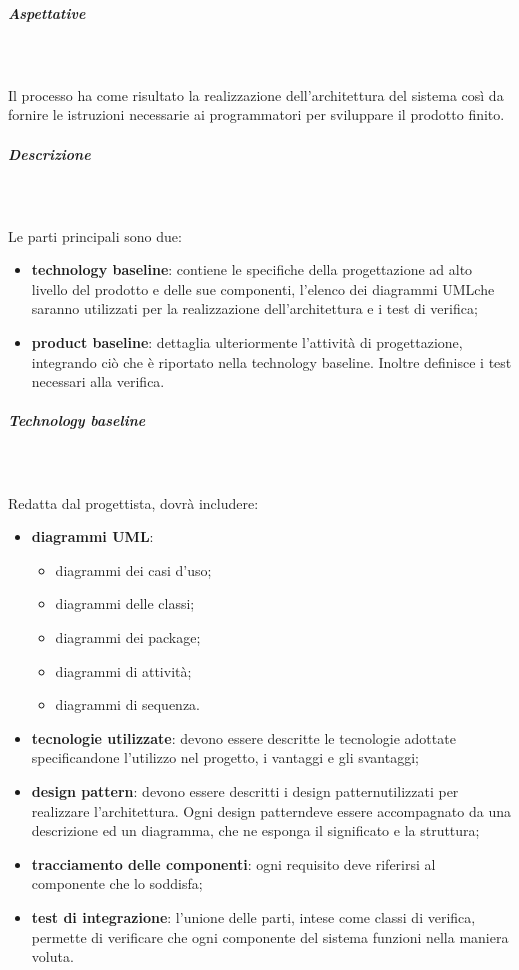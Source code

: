			
			\subparagraph{Aspettative} \mbox{}\\ \mbox{}\\
			\noindent Il processo ha come risultato la realizzazione dell'architettura del sistema così 
			da fornire le istruzioni necessarie ai programmatori per sviluppare il prodotto finito.
			\newline
			
			\subparagraph{Descrizione}  \mbox{}\\ \mbox{}\\
			\noindent Le parti principali sono due:
				\begin{itemize}
					\item \textbf{technology baseline}: contiene le specifiche della 
						progettazione ad alto livello del prodotto e delle sue componenti, l'elenco dei 
						diagrammi UML\glosp che saranno utilizzati per la realizzazione 
						dell'architettura e i test di verifica;
					\item \textbf{product baseline}: dettaglia ulteriormente l'attività di 
						progettazione, integrando ciò che è riportato nella technology baseline. Inoltre 
						definisce i test necessari alla verifica. \newline
				\end{itemize}
			
			
		\subparagraph{Technology baseline} \mbox{}\\ \mbox{}\\
				
			\noindent Redatta dal progettista, dovrà includere:
				\begin{itemize}
					\item \textbf{diagrammi UML\glo}:
					\begin{itemize}
						\item diagrammi dei casi d'uso;
						\item diagrammi delle classi;
						\item diagrammi dei package;
						\item diagrammi di attività;
						\item diagrammi di sequenza.
					\end{itemize}
					\item \textbf{tecnologie utilizzate}: devono essere descritte le tecnologie 
						adottate specificandone l'utilizzo nel progetto, i vantaggi e gli svantaggi;
					\item \textbf{design pattern\glo}: devono essere descritti i design 
						pattern\glosp utilizzati per realizzare l'architettura. Ogni design 
						pattern\glosp deve essere accompagnato da una descrizione ed un diagramma, che 
						ne esponga il significato e la struttura;
					\item \textbf{tracciamento delle componenti}: ogni requisito deve riferirsi 
						al componente che lo soddisfa;
					\item \textbf{test di integrazione}: l'unione delle parti, intese come 
						classi di verifica, permette di verificare che ogni componente del sistema 
						funzioni nella maniera voluta. \newline
				\end{itemize}
						

